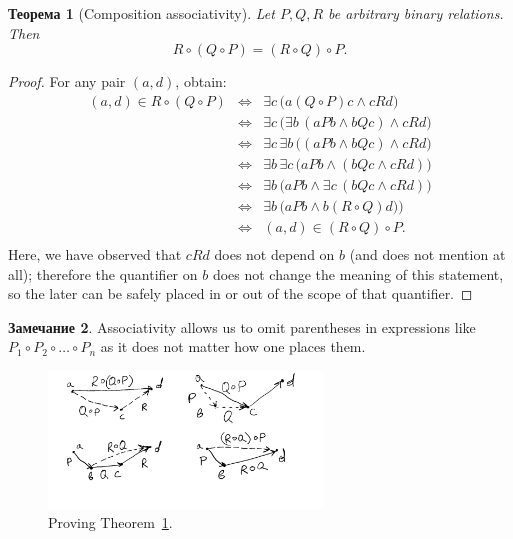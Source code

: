 \documentclass[12pt,notitlepage]{article}
\theoremstyle{plain}
\newtheorem{thm}{Теорема}[section]
\theoremstyle{definition}
\newtheorem{rem}[thm]{Замечание}
\theoremstyle{plain}
\newcommand{\1}{\mathbf{1}}
\newcommand{\0}{\mathbf{0}}
\newcommand{\mcomm}[1]{}
\begin{document}
\begin{thm}[Composition associativity]\label{ch0:rel_comp}
	Let $P, Q, R$ be arbitrary binary relations. Then
	$$R \circ (Q \circ P) = (R \circ Q) \circ P.$$
\end{thm}
\begin{proof} For any pair $(a,d)$, obtain:
	$$
	\begin{array}{rcl}
		(a, d) \in R \circ (Q \circ P) &\iff& \exists c\, \bigl( a(Q \circ P)c \wedge cRd \bigr)\\
		&\iff&\exists c\, \bigl( \exists b\, ( aPb \wedge bQc ) \wedge cRd \bigr)\\
		&\iff& \exists c\, \exists b\, \bigl(  (aPb \wedge bQc)  \wedge cRd \bigr)\\
		&\iff& \exists b\, \exists c\, \bigl(  aPb \wedge (bQc  \wedge cRd) \bigr)\\
		&\iff&\exists b\, \bigl( aPb \wedge \exists c\, (bQc  \wedge cRd ) \bigr)\\
		&\iff&\exists b\, \bigl( aPb \wedge b(R \circ Q)d ) \bigr)\\
		&\iff& (a,d) \in (R \circ Q)\circ P.\\
	\end{array}
	$$
	Here, we have observed that $c R d$ does not depend on $b$ (and does not mention at all); therefore the quantifier on $b$ does not change the meaning of this statement, so the later can be safely placed in or out of the scope of that quantifier.
	
\end{proof}
\mcomm{For this argument, the Instructor might wish to explain the logical equivalences $\exists x\, (A(x) \wedge B) \equiv \exists x\, A(x) \wedge B$ (where $B$ does not mention $x$) and $\exists x \exists y\, A \equiv \exists y \exists x\, A$ in more detail.}
\begin{rem}
	Associativity allows us to omit parentheses in expressions like $P_1 \circ P_2 \circ \ldots \circ P_n$ as it does not matter how one places them.
\end{rem}

\begin{figure}[h]
	\centering
	\includegraphics*[width=0.65\textwidth]{comp_assoc.pdf}
	\caption{Proving Theorem~\ref{ch0:rel_comp}.}
\end{figure}
\end{document}
